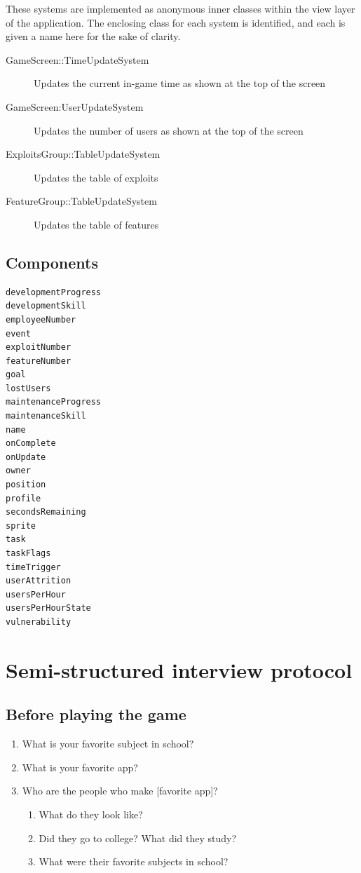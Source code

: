 \documentclass[letterpaper]{article}
\begin{document}
These systems are implemented as anonymous inner classes within the
view layer of the application.  The enclosing class for each system is
identified, and each is given a name here for the sake of clarity.

\begin{description}
\item[GameScreen::TimeUpdateSystem] Updates the current in-game time
 as shown at the top of the screen
\item[GameScreen:UserUpdateSystem] Updates the number of users as shown
 at the top of the screen
\item[ExploitsGroup::TableUpdateSystem] Updates the table of exploits 
\item[FeatureGroup::TableUpdateSystem] Updates the table of features 
\end{description}

\clearpage
\subsection*{Components}
\begin{multicols}{2}
\begin{verbatim}
developmentProgress
developmentSkill
employeeNumber
event
exploitNumber
featureNumber
goal
lostUsers
maintenanceProgress
maintenanceSkill
name
onComplete
onUpdate
owner
position
profile
secondsRemaining
sprite
task
taskFlags
timeTrigger
userAttrition
usersPerHour
usersPerHourState
vulnerability
\end{verbatim}
\end{multicols}

\clearpage
\section{Semi-structured interview protocol}
\label{appendix:interview-protocol}

\subsection*{Before playing the game}

\begin{enumerate}
\item What is your favorite subject in school?
\item What is your favorite app?
\item Who are the people who make [favorite app]?
\begin{enumerate}
\item What do they look like?
\item Did they go to college? What did they study?
\item What were their favorite subjects in school?
\end{enumerate}
\end{enumerate}
\end{document}
